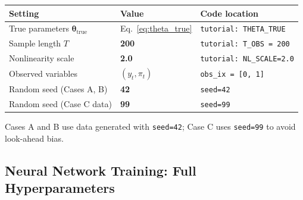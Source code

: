 \documentclass[11pt,a4paper]{article}
\theoremstyle{definition}
\newcommand{\btheta}{\boldsymbol{\theta}}
\newcommand{\code}[1]{\texttt{\color{codecolor}#1}}
\begin{document}
	\begin{center}
		\begin{tabular}{lll}
			\toprule
			Setting & Value & Code location \\
			\midrule
			True parameters $\btheta_{\mathrm{true}}$ & Eq.~\eqref{eq:theta_true} & \code{tutorial: THETA\_TRUE} \\
			Sample length $T$ & \textbf{200} & \code{tutorial: T\_OBS = 200} \\
			Nonlinearity scale & \textbf{2.0} & \code{tutorial: NL\_SCALE=2.0} \\
			Observed variables & $(y_t, \pi_t)$ & \code{obs\_ix = [0, 1]} \\
			Random seed (Cases A, B) & \textbf{42} & \code{seed=42} \\
			Random seed (Case C data) & \textbf{99} & \code{seed=99} \\
			\bottomrule
		\end{tabular}
	\end{center}
	
	Cases A and B use data generated with \code{seed=42}; Case C uses \code{seed=99} to avoid look-ahead bias.
	
	\subsection{Neural Network Training: Full Hyperparameters}
	\label{sec:training_hyper}
	
\end{document}

